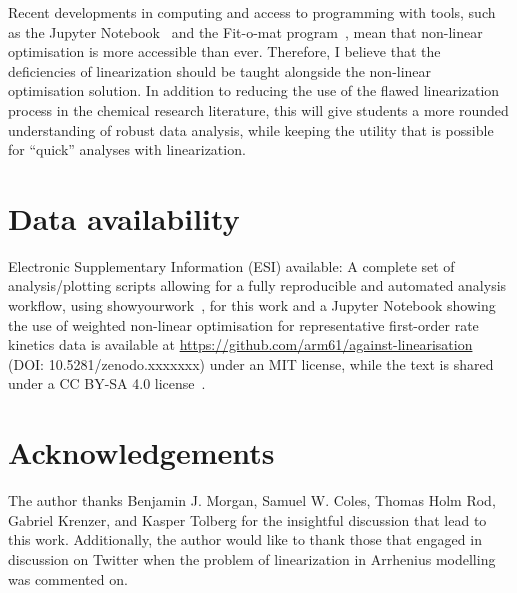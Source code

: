 \documentclass[reprint,superscriptaddress,nobibnotes,amsmath,amssymb]{revtex4-2}
\begin{document}
Recent developments in computing and access to programming with tools, such as the Jupyter Notebook~\cite{kluyver_jupyter_2016} and the Fit-o-mat program~\cite{mglich_open_2018}, mean that non-linear optimisation is more accessible than ever. 
Therefore, I believe that the deficiencies of linearization should be taught alongside the non-linear optimisation solution. 
In addition to reducing the use of the flawed linearization process in the chemical research literature, this will give students a more rounded understanding of robust data analysis, while keeping the utility that is possible for ``quick'' analyses with linearization.

\section*{Data availability}

Electronic Supplementary Information (ESI) available: A complete set of analysis/plotting scripts allowing for a fully reproducible and automated analysis workflow, using showyourwork~\cite{luger_showyourwork_2021}, for this work and a Jupyter Notebook showing the use of weighted non-linear optimisation for representative first-order rate kinetics data is available at \url{https://github.com/arm61/against-linearisation} (DOI: 10.5281/zenodo.xxxxxxx) under an MIT license, while the text is shared under a CC BY-SA 4.0 license~\cite{mccluskey_github_2023}. \\

\section*{Acknowledgements}

The author thanks Benjamin J. Morgan, Samuel W. Coles, Thomas Holm Rod, Gabriel Krenzer, and Kasper Tolberg for the insightful discussion that lead to this work. 
Additionally, the author would like to thank those that engaged in discussion on Twitter when the problem of linearization in Arrhenius modelling was commented on. 


\end{document}
